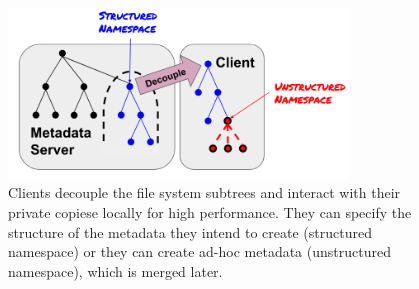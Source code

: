 \begin{figure}
  \centering
  \includegraphics[width=90mm]{figures/intro.png}
  \caption{Clients decouple the file system subtrees and interact with their
  private copiese locally for high performance. They can specify the structure of
  the metadata they intend to create (structured namespace) or they can create
  ad-hoc metadata (unstructured namespace), which is merged later.\label{fig:intro}}
\end{figure}
 
